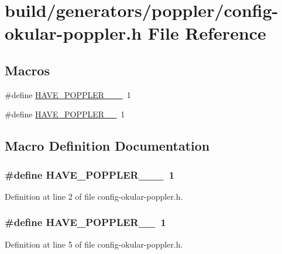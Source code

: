 \hypertarget{config-okular-poppler_8h}{\section{build/generators/poppler/config-\/okular-\/poppler.h File Reference}
\label{config-okular-poppler_8h}
}
\subsection*{Macros}
\begin{DoxyCompactItemize}
\item 
\#define \hyperlink{config-okular-poppler_8h_af3b9fd337b827aa70c902c12a09ce9a6}{H\+A\+V\+E\+\_\+\+P\+O\+P\+P\+L\+E\+R\+\_\+\_\+\_}~1
\item 
\#define \hyperlink{config-okular-poppler_8h_ad4376ff458a972a2d4eb5f52825e7e01}{H\+A\+V\+E\+\_\+\+P\+O\+P\+P\+L\+E\+R\+\_\+\_}~1
\end{DoxyCompactItemize}


\subsection{Macro Definition Documentation}
\hypertarget{config-okular-poppler_8h_af3b9fd337b827aa70c902c12a09ce9a6}{
\subsubsection[{H\+A\+V\+E\+\_\+\+P\+O\+P\+P\+L\+E\+R\+\_\+0\+\_\+12\+\_\+1}]{\setlength{\rightskip}{0pt plus 5cm}\#define H\+A\+V\+E\+\_\+\+P\+O\+P\+P\+L\+E\+R\+\_\+\_\+\_~1}}\label{config-okular-poppler_8h_af3b9fd337b827aa70c902c12a09ce9a6}


Definition at line 2 of file config-\/okular-\/poppler.\+h.

\hypertarget{config-okular-poppler_8h_ad4376ff458a972a2d4eb5f52825e7e01}{
\subsubsection[{H\+A\+V\+E\+\_\+\+P\+O\+P\+P\+L\+E\+R\+\_\+0\+\_\+16}]{\setlength{\rightskip}{0pt plus 5cm}\#define H\+A\+V\+E\+\_\+\+P\+O\+P\+P\+L\+E\+R\+\_\+\_~1}}\label{config-okular-poppler_8h_ad4376ff458a972a2d4eb5f52825e7e01}


Definition at line 5 of file config-\/okular-\/poppler.\+h.

